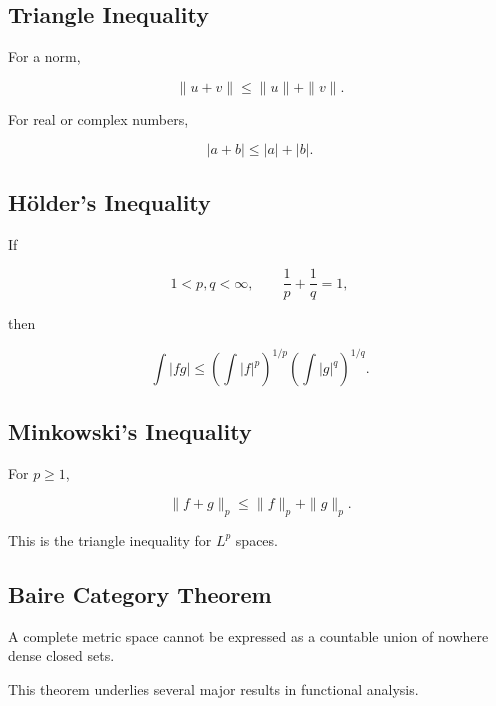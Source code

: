 \subsection{Triangle Inequality}
\label{subsec:triangle-inequality-summary}

For a norm,

\[
\boxed{
\|u+v\|
\leq
\|u\|+\|v\|.
}
\]

For real or complex numbers,

\[
\boxed{
|a+b|
\leq
|a|+|b|.
}
\]

\subsection{Hölder's Inequality}
\label{subsec:holder-summary}

If

\[
1<p,q<\infty,
\qquad
\frac1p+\frac1q=1,
\]

then

\[
\boxed{
\int
|fg|
\leq
\left(
\int|f|^p
\right)^{1/p}
\left(
\int|g|^q
\right)^{1/q}.
}
\]

\subsection{Minkowski's Inequality}
\label{subsec:minkowski-summary}

For \(p\geq1\),

\[
\boxed{
\|f+g\|_p
\leq
\|f\|_p+\|g\|_p.
}
\]

This is the triangle inequality for \(L^p\) spaces.

\subsection{Baire Category Theorem}
\label{subsec:baire-category-summary}

A complete metric space cannot be expressed as a countable union of nowhere
dense closed sets.

This theorem underlies several major results in functional analysis.

